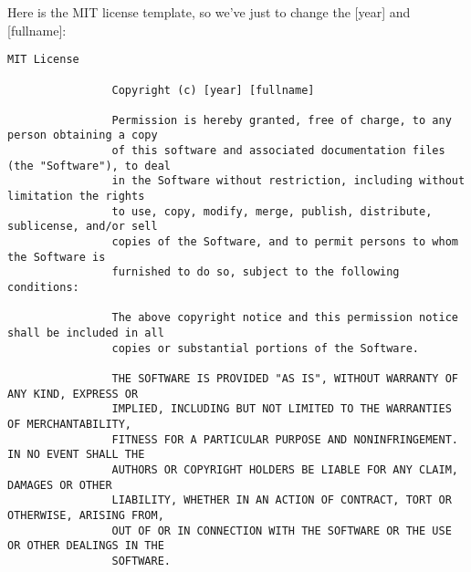 \documentclass[a4paper]{article}
\begin{document}
				Here is the MIT license template, so we've just to change the [year] and [fullname]:
				
				\begin{lstlisting}[caption=MIT license template, label=lst:mitLicenseTemplate]
				MIT License
				
				Copyright (c) [year] [fullname]
				
				Permission is hereby granted, free of charge, to any person obtaining a copy
				of this software and associated documentation files (the "Software"), to deal
				in the Software without restriction, including without limitation the rights
				to use, copy, modify, merge, publish, distribute, sublicense, and/or sell
				copies of the Software, and to permit persons to whom the Software is
				furnished to do so, subject to the following conditions:
				
				The above copyright notice and this permission notice shall be included in all
				copies or substantial portions of the Software.
				
				THE SOFTWARE IS PROVIDED "AS IS", WITHOUT WARRANTY OF ANY KIND, EXPRESS OR
				IMPLIED, INCLUDING BUT NOT LIMITED TO THE WARRANTIES OF MERCHANTABILITY,
				FITNESS FOR A PARTICULAR PURPOSE AND NONINFRINGEMENT. IN NO EVENT SHALL THE
				AUTHORS OR COPYRIGHT HOLDERS BE LIABLE FOR ANY CLAIM, DAMAGES OR OTHER
				LIABILITY, WHETHER IN AN ACTION OF CONTRACT, TORT OR OTHERWISE, ARISING FROM,
				OUT OF OR IN CONNECTION WITH THE SOFTWARE OR THE USE OR OTHER DEALINGS IN THE
				SOFTWARE.
				\end{lstlisting}
\end{document}
